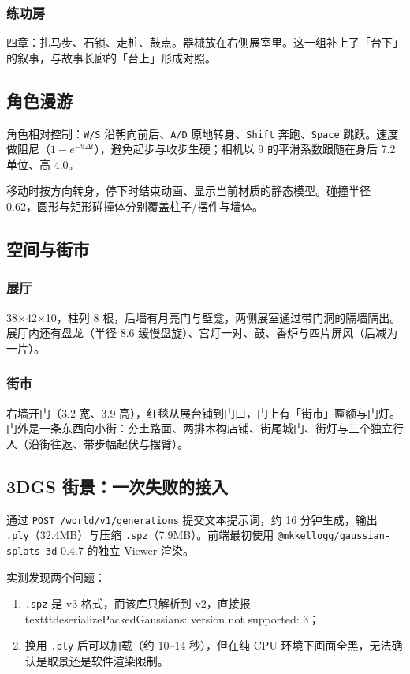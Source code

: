 \documentclass[UTF8,a4paper,11pt]{ctexart}
\begin{document}
\subsubsection{练功房}
四章：扎马步、石锁、走桩、鼓点。器械放在右侧展室里。这一组补上了「台下」的叙事，与故事长廊的「台上」形成对照。

\subsection{角色漫游}
角色相对控制：\texttt{W/S} 沿朝向前后、\texttt{A/D} 原地转身、\texttt{Shift} 奔跑、\texttt{Space} 跳跃。速度做阻尼（$1-e^{-9\Delta t}$），避免起步与收步生硬；相机以 9 的平滑系数跟随在身后 7.2 单位、高 4.0。

移动时按方向转身，停下时结束动画、显示当前材质的静态模型。碰撞半径 0.62，圆形与矩形碰撞体分别覆盖柱子/摆件与墙体。

\subsection{空间与街市}

\subsubsection{展厅}
38$\times$42$\times$10，柱列 8 根，后墙有月亮门与壁龛，两侧展室通过带门洞的隔墙隔出。展厅内还有盘龙（半径 8.6 缓慢盘旋）、宫灯一对、鼓、香炉与四片屏风（后减为一片）。

\subsubsection{街市}
右墙开门（3.2 宽、3.9 高），红毯从展台铺到门口，门上有「街市」匾额与门灯。门外是一条东西向小街：夯土路面、两排木构店铺、街尾城门、街灯与三个独立行人（沿街往返、带步幅起伏与摆臂）。

\subsection{3DGS 街景：一次失败的接入}

通过 \texttt{POST /world/v1/generations} 提交文本提示词，约 16 分钟生成，输出 \texttt{.ply}（32.4MB）与压缩 \texttt{.spz}（7.9MB）。前端最初使用 \texttt{@mkkellogg/gaussian-splats-3d} 0.4.7 的独立 Viewer 渲染。

实测发现两个问题：
\begin{enumerate}[itemsep=2pt]
  \item \texttt{.spz} 是 v3 格式，而该库只解析到 v2，直接报 \\texttt{deserializePackedGaussians: version not supported: 3}；
  \item 换用 \texttt{.ply} 后可以加载（约 10--14 秒），但在纯 CPU 环境下画面全黑，无法确认是取景还是软件渲染限制。
\end{enumerate}
\end{document}
